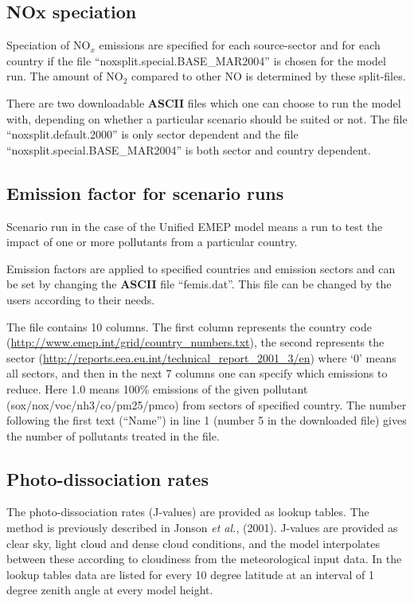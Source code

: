\subsection{NOx speciation}
Speciation of NO$_x$ emissions are specified for each source-sector and
for each country if the file ``noxsplit.special.BASE\_MAR2004'' is
chosen for the model run. The amount of NO$_{2}$ compared to
other NO is determined by these split-files.

There are two downloadable {\bf ASCII} files which one can choose to
run the model with, depending on whether a particular scenario should be
suited or not.
The file ``noxsplit.default.2000'' is only sector dependent and the file
``noxsplit.special.BASE\_MAR2004'' is both sector and country dependent.

\subsection{Emission factor for scenario runs}
Scenario run in the case of the Unified EMEP model means a run to test
the impact of one or more pollutants from a particular
country. 

Emission factors are applied to specified countries and
emission sectors and can be set by changing the {\bf ASCII} file
``femis.dat''. 
This file can be changed by the users according to their needs.

The file contains 10 columns. The first column represents
the country code (\url{http://www.emep.int/grid/country_numbers.txt}),
the second represents the sector
(\url{http://reports.eea.eu.int/technical_report_2001_3/en}) 
where `0' means all sectors, and then in the next 7 columns one can specify
which emissions to reduce. Here 1.0 means 100\% emissions of the given
pollutant 
(sox/nox/voc/nh3/co/pm25/pmco) from sectors of specified country. The
number following the first text (``Name'') in line 1 (number 5 in
the downloaded file) gives the number of pollutants treated in the file.

\subsection{Photo-dissociation rates}
The photo-dissociation rates (J-values) are provided as lookup
tables. The method is previously described in Jonson {\sl et
al.}, (2001). J-values are provided as clear sky, light cloud and dense
cloud conditions, and the model interpolates between these according
to cloudiness from the meteorological input data. In the lookup tables
data are listed for every 10 degree latitude at an interval of 1
degree zenith angle at every model height.


